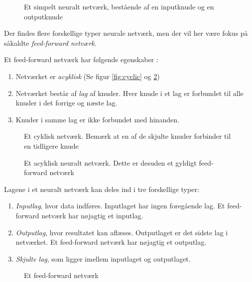 \documentclass[../SOP.tex]{subfiles}
\begin{document}
\begin{figure}[ht]
  \centering
  
  \caption{Et simpelt neuralt netværk, bestående af en inputknude og en outputknude}
  \label{fig:simplenet}
\end{figure}
Der findes flere forskellige typer neurale netværk, men der vil her være fokus på såkaldte \emph{feed-forward netværk}.\\
\begin{definition}
  Et feed-forward netværk har følgende egenskaber \parencite{feedforward}:
  \begin{enumerate}
    \item Netværket er \emph{acyklisk} (Se figur \ref{fig:cyclic} og \ref{fig:acyclic})
    \item Netværket består af \emph{lag} af knuder. Hver knude i et lag er forbundet til alle knuder i det forrige og næste lag.
    \item Knuder i samme lag er ikke forbundet med hinanden.
  \end{enumerate}
\end{definition}
\begin{figure}[h]
  \centering
  \begin{minipage}[b]{0.45\textwidth}
    
    \caption{Et cyklisk netværk. Bemærk at en af de skjulte knuder forbinder til en tidligere knude}
    \label{fig:cyclic}
  \end{minipage}
  \hfill
  \begin{minipage}[b]{0.45\textwidth}
    
    \caption{Et acyklisk neuralt netværk. Dette er desuden et gyldigt feed-forward netværk}
    \label{fig:acyclic}
  \end{minipage}
\end{figure}
Lagene i et neuralt netværk kan deles ind i tre forskellige typer:
\begin{enumerate}
  \item \emph{Inputlag}, hvor data indføres. Inputlaget har ingen foregående lag. Et feed-forward netværk har nøjagtig et inputlag.
  \item \emph{Outputlag}, hvor resultatet kan aflæses. Outputlaget er det sidste lag i netværket. Et feed-forward netværk har nøjagtig et outputlag.
  \item \emph{Skjulte lag}, som ligger imellem inputlaget og outputlaget.
\end{enumerate}


\begin{figure}[ht]
  \centering
  
  \caption{Et feed-forward netværk}
  \label{fig:feed-forward}
\end{figure}
\end{document}
